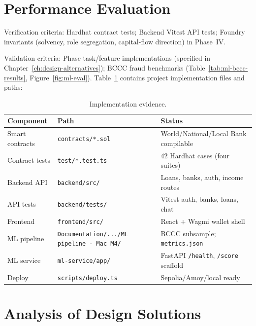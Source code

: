 \label{ch:evaluation}
\label{ch:market-analysis}

\section{Performance Evaluation}
\label{sec:performance-evaluation}
\label{sec:eval-method}
\label{sec:verification-validation}
\label{sec:foundry}

Verification criteria: Hardhat contract tests; Backend Vitest API tests; Foundry invariants (solvency, role segregation, capital-flow direction) in Phase~IV.

Validation criteria: Phase task/feature implementations (specified in Chapter~\ref{ch:design-alternatives}); BCCC fraud benchmarks (Table~\ref{tab:ml-bccc-results}, Figure~\ref{fig:ml-eval}). Table~\ref{tab:implementation-evidence} contains project implementation files and paths:

\label{sec:implementation-evidence}

\begin{table}[H]
\centering
\caption[Implementation evidence]{Implementation evidence.}
\label{tab:implementation-evidence}
\small
\begin{tabular}{@{}p{3.2cm}p{4.4cm}p{6.6cm}@{}}
\toprule
\tableheadcolor
\textbf{Component} & \textbf{Path} & \textbf{Status} \\
\midrule
Smart contracts & \texttt{contracts/*.sol} & World/National/Local Bank compilable \\
Contract tests & \texttt{test/*.test.ts} & 42 Hardhat cases (four suites) \\
Backend API & \texttt{backend/src/} & Loans, banks, auth, income routes \\
API tests & \texttt{backend/tests/} & Vitest auth, banks, loans, chat \\
Frontend & \texttt{frontend/src/} & React + Wagmi wallet shell \\
ML pipeline & \texttt{Documentation/.../ML pipeline - Mac M4/} & BCCC subsample; \texttt{metrics.json} \\
ML service & \texttt{ml-service/app/} & FastAPI \texttt{/health}, \texttt{/score} scaffold \\
Deploy & \texttt{scripts/deploy.ts} & Sepolia/Amoy/local ready \\
\bottomrule
\end{tabular}
\end{table}

\section{Analysis of Design Solutions}
\label{sec:analysis-design-solutions}

